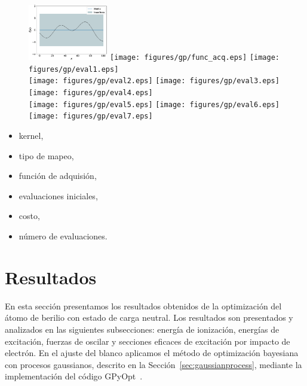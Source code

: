 \begin{figure}[H]
\centering
 \includegraphics[width=0.31\textwidth]{figures/gp/funcion.eps} 
 \texttt{[image: figures/gp/func\_acq.eps]} 
 \texttt{[image: figures/gp/eval1.eps]} \\
  \texttt{[image: figures/gp/eval2.eps]}
  \texttt{[image: figures/gp/eval3.eps]}
  \texttt{[image: figures/gp/eval4.eps]} \\
  \texttt{[image: figures/gp/eval5.eps]}
  \texttt{[image: figures/gp/eval6.eps]}
  \texttt{[image: figures/gp/eval7.eps]} 
\end{figure}

\begin{itemize}
\item kernel, 
\item tipo de mapeo, 
\item función de adquisión, 
\item evaluaciones iniciales,
\item costo, 
\item número de evaluaciones.
\end{itemize}

\newpage
\section{Resultados}

En esta sección presentamos los resultados obtenidos de la optimización
del átomo de berilio con estado de carga neutral. Los resultados son 
presentados y analizados en las siguientes subsecciones: energía de 
ionización, energías de excitación, fuerzas de oscilar y secciones 
eficaces de excitación por impacto de electrón. En el ajuste del blanco 
aplicamos el método de optimización bayesiana con procesos gaussianos, 
descrito en la Sección~\ref{sec:gaussianprocess}, mediante la 
implementación del código GPyOpt~\cite{GPyOpt}.


